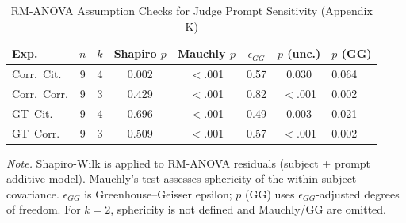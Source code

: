 \begin{table}[H]
\centering
\caption{RM-ANOVA Assumption Checks for Judge Prompt Sensitivity (Appendix K)}
\label{tab:prompt_sensitivity_assumptions}
\begin{threeparttable}
\scriptsize
\setlength{\tabcolsep}{3pt}
\renewcommand{\arraystretch}{1.1}
\begin{tabular}{lccccccl}
\toprule
\textbf{Exp.} & \textbf{$n$} & \textbf{$k$} & \textbf{Shapiro $p$} & \textbf{Mauchly $p$} & \textbf{$\epsilon_{GG}$} & \textbf{$p$ (unc.)} & \textbf{$p$ (GG)} \\
\midrule
Corr.\ Cit. & 9 & 4 & 0.002 & $<$.001 & 0.57 & 0.030 & 0.064 \\
Corr.\ Corr. & 9 & 3 & 0.429 & $<$.001 & 0.82 & $<$.001 & 0.002 \\
GT\ Cit. & 9 & 4 & 0.696 & $<$.001 & 0.49 & 0.003 & 0.021 \\
GT\ Corr. & 9 & 3 & 0.509 & $<$.001 & 0.57 & $<$.001 & 0.002 \\
\bottomrule
\end{tabular}
\begin{tablenotes}
\scriptsize
\item \textit{Note.} Shapiro-Wilk is applied to RM-ANOVA residuals (subject + prompt additive model). Mauchly's test assesses sphericity of the within-subject covariance. $\epsilon_{GG}$ is Greenhouse--Geisser epsilon; $p$ (GG) uses $\epsilon_{GG}$-adjusted degrees of freedom. For $k=2$, sphericity is not defined and Mauchly/GG are omitted.
\end{tablenotes}
\end{threeparttable}
\end{table}